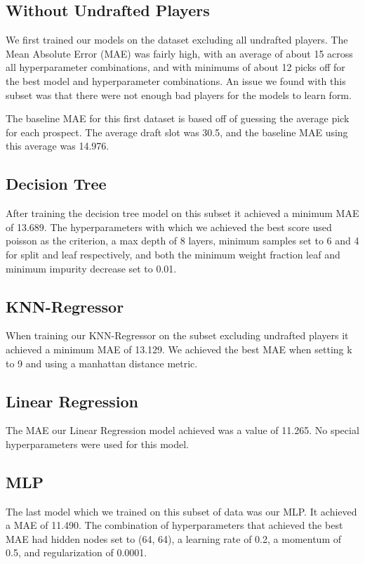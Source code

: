 \documentclass{article}
\begin{document}
\subsection{Without Undrafted Players}

We first trained our models on the dataset excluding all undrafted players. The
Mean Absolute Error (MAE) was fairly high, with an average of about 15 across
all hyperparameter combinations, and with minimums of about 12 picks off for the
best model and hyperparameter combinations. An issue we found with this subset
was that there were not enough bad players for the models to learn form. 

The baseline MAE for this first dataset is based off of guessing the average
pick for each prospect. The average draft slot was 30.5, and the baseline MAE
using this average was 14.976.

\subsection{Decision Tree}

After training the decision tree model on this subset it achieved a minimum MAE
of 13.689. The hyperparameters with which we achieved the best score used
poisson as the criterion, a max depth of 8 layers, minimum samples set to 6 and
4 for split and leaf respectively, and both the minimum weight fraction leaf and
minimum impurity decrease set to 0.01.

\subsection{KNN-Regressor}

When training our KNN-Regressor on the subset excluding undrafted players it
achieved a minimum MAE of 13.129. We achieved the best MAE when setting k to 9
and using a manhattan distance metric.

\subsection{Linear Regression}

The MAE our Linear Regression model achieved was a value of 11.265. No special
hyperparameters were used for this model.

\subsection{MLP}

The last model which we trained on this subset of data was our MLP. It achieved
a MAE of 11.490. The combination of hyperparameters that achieved the
best MAE had hidden nodes set to (64, 64), a learning rate of 0.2, a momentum of
0.5, and regularization of 0.0001.
\end{document}
